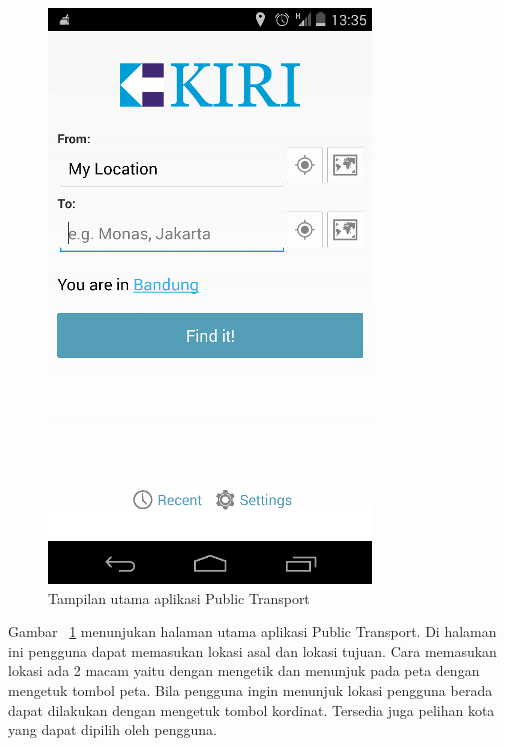 \begin{figure}[h]
	\centering
		\includegraphics[scale=0.5]{Gambar/KIRI_Android/home}
	\caption{Tampilan utama aplikasi Public Transport}
	\label{fig:home}
\end{figure}

Gambar ~\ref{fig:home} menunjukan halaman utama aplikasi Public Transport. Di halaman ini pengguna dapat memasukan lokasi asal dan lokasi tujuan. Cara memasukan lokasi ada 2 macam yaitu dengan mengetik dan menunjuk pada peta dengan mengetuk tombol peta. Bila pengguna ingin menunjuk lokasi pengguna berada dapat dilakukan dengan mengetuk tombol kordinat. Tersedia juga pelihan kota yang dapat dipilih oleh pengguna.

